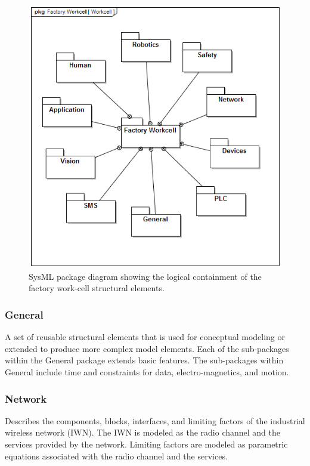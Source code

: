 \begin{figure}[t]
	\begin{center}
		\includegraphics[width=0.95\columnwidth]{./chapter-sysml/diagrams/pkg__Factory_Workcell__Workcell}%
		\caption{SysML package diagram showing the logical containment of the factory work-cell structural elements.}%
		\label{sysml:fig:pdd-workcell}
	\end{center}
\end{figure}


\subsubsection{General} A set of reusable structural elements that is used for conceptual modeling or extended to produce more complex model elements.  Each of the sub-packages within the General package extends basic features.  The sub-packages within General include time and constraints for data, electro-magnetics, and motion.

\subsubsection{Network} Describes the components, blocks, interfaces, and limiting factors of the industrial wireless network (IWN).  The IWN is modeled as the radio channel and the services provided by the network. Limiting factors are modeled as parametric equations associated with the radio channel and the services.

